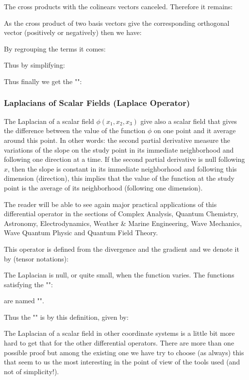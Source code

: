 	The cross products with the colinears vectors canceled. Therefore it remains:
	
	As the cross product of two basis vectors give the corresponding orthogonal vector (positively or negatively) then we have:
	
	By regrouping the terms it comes:
	
	Thus by simplifying:
	
	Thus finally we get the "\label{rotational in spherical coordinates}":
	
	
	\pagebreak
	\subsubsection{Laplacians of Scalar Fields (Laplace Operator)}\label{scalar laplacian}
	The Laplacian of a scalar field $\phi(x_1,x_2,x_3)$ give also a scalar field that gives the difference between the value of the function $\phi$ on one point and it average around this point. In other words: the second partial derivative measure the variations of the slope on the study point in its immediate neighborhood and following one direction at a time. If the second partial derivative is null following $x$, then the slope is constant in its immediate neighborhood and following this dimension (direction), this implies that the value of the function at the study point is the average of its neighborhood (following one dimension).
	
	The reader will be able to see again major practical applications of this differential operator in the sections of Complex Analysis, Quantum Chemistry, Astronomy, Electrodynamics, Weather \& Marine Engineering, Wave Mechanics, Wave Quantum Physic and Quantum Field Theory.
	
	This operator is defined from the divergence and the gradient and we denote it by (tensor notations):
	
	The Laplacian is null, or quite small, when the function varies. The functions satisfying the "":
	
	are named "".
	
	Thus the "" is by this definition, given by:
	
	The Laplacian of a scalar field in other coordinate systems is a little bit more hard to get that for the other differential operators. There are more than one possible proof but among the existing one we have try to choose (as always) this that seem to us the most interesting in the point of view of the tools used (and not of simplicity!).

